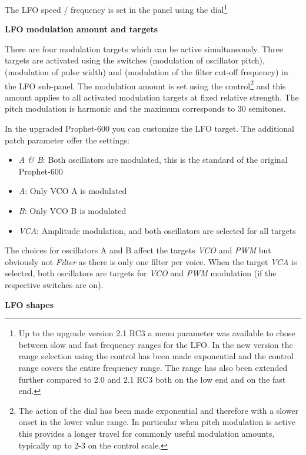 The LFO speed / frequency is set in the panel using the \lfofreq dial\footnote{Up to the upgrade version 2.1 RC3 a menu parameter was available to chose between slow and fast frequency ranges for the LFO. In the new version the range selection using the \lfofreq control has been made exponential and the control range covers the entire frequency range. The range has also been extended further compared to 2.0 and 2.1 RC3 both on the low end and on the fast end.} 

\textbf{LFO modulation amount and targets}

There are four modulation targets which can be active simultaneously. Three targets are activated using the switches \lfovco (modulation of oscillator pitch), \lfopwm (modulation of pulse width) and \lfofil (modulation of the filter cut-off frequency) in the LFO sub-panel. The modulation amount is set using the \lfoamt control\footnote{The action of the \lfoamt dial has been made exponential and therefore with a slower onset in the lower value range. In particular when pitch modulation is active this provides a longer travel for commonly useful modulation amounts, typically up to 2-3 on the control scale.} and this amount applies to all activated modulation targets at fixed relative strength. The pitch modulation is harmonic and the maximum \lfoamt corresponds to 30 semitones.  

In the upgraded Prophet-600 you can customize the LFO target. The additional patch parameter \lfotarget
offer the settings: 

\begin{itemize}
  \item \textit{A \& B}: Both oscillators are modulated, this is the standard of the original Prophet-600 
  \item \textit{A}: Only VCO A is modulated
  \item \textit{B}: Only VCO B is modulated
  \item \textit{VCA}: Amplitude modulation, and both oscillators are selected for all targets
\end{itemize}

The choices for oscillators A and B affect the targets \textit{VCO} and \textit{PWM} but obviously not \textit{Filter} as there is only one filter per voice. When the target \textit{VCA} is selected, both oscillators are targets for \textit{VCO} and \textit{PWM} modulation (if the respective switches are on). 

\textbf{LFO shapes}

